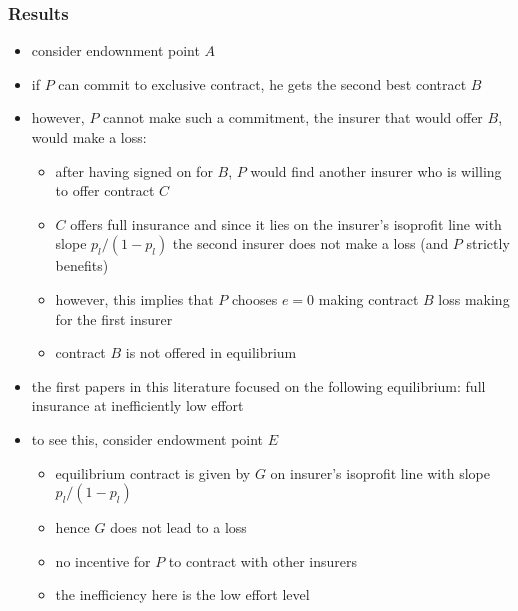 \documentclass[11pt,english]{beamer}
\begin{document}
\begin{frame}[allowframebreaks]\frametitle{Results}
\label{sec-7-4}
\begin{itemize}

\item consider endownment point $A$\\
\label{sec-7-4-1}%
\item if $P$ can commit to exclusive contract, he gets the second best contract $B$\\
\label{sec-7-4-2}%
\item however, $P$ cannot make such a commitment, the insurer that would offer $B$, would make a loss:
\label{sec-7-4-3}%
\begin{itemize}

\item after having signed on for $B$, $P$ would find another insurer who is willing to offer contract $C$\\
\label{sec-7-4-3-1}%
\item $C$ offers full insurance and since it lies on the insurer's isoprofit line with slope $p_{l}/(1-p_{l})$ the second insurer does not make a loss (and $P$ strictly benefits)\\
\label{sec-7-4-3-2}%
\item however, this implies that $P$ chooses $e=0$ making contract $B$ loss making for the first insurer\\
\label{sec-7-4-3-3}%
\item contract $B$ is not offered in equilibrium\\
\label{sec-7-4-3-4}%
\end{itemize} %

\item the first papers in this literature focused on the following equilibrium: full insurance at inefficiently low effort\\
\label{sec-7-4-4}%
\item to see this, consider endowment point $E$
\label{sec-7-4-5}%
\begin{itemize}

\item equilibrium contract is given by $G$ on insurer's isoprofit line with slope $p_{l}/(1-p_{l})$\\
\label{sec-7-4-5-1}%
\item hence $G$ does not lead to a loss\\
\label{sec-7-4-5-2}%
\item no incentive for $P$ to contract with other insurers\\
\label{sec-7-4-5-3}%
\item the inefficiency here is the low effort level\\
\label{sec-7-4-5-4}%
\end{itemize} %


\end{itemize}
\end{frame}
\end{document}
